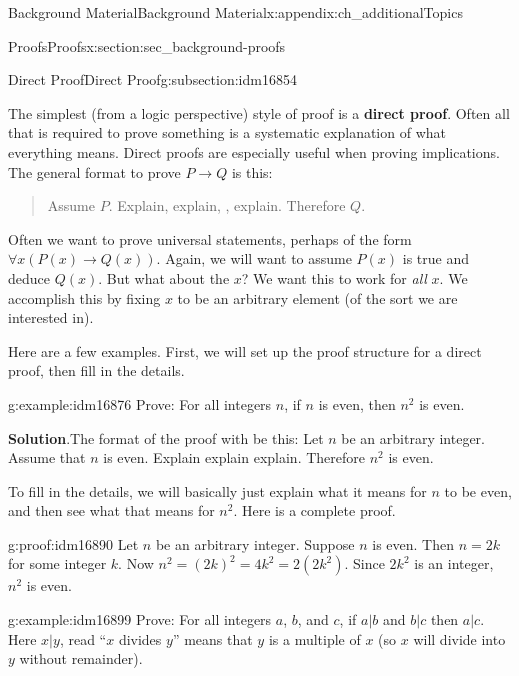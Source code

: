 \documentclass[oneside,10pt,]{book}
\newcommand{\terminology}[1]{\textbf{#1}}
\numberwithin{equation}{chapter}
\def\imp{\rightarrow}
\begin{document}
\begin{appendixptx}{Background Material}{}{Background Material}{}{}{x:appendix:ch_additionalTopics}
\begin{sectionptx}{Proofs}{}{Proofs}{}{}{x:section:sec_background-proofs}
\begin{introduction}{}
\end{introduction}%
%
%
\typeout{************************************************}
\typeout{************************************************}
%
\begin{subsectionptx}{Direct Proof}{}{Direct Proof}{}{}{g:subsection:idm16854}
%
\par
The simplest (from a logic perspective) style of proof is a \terminology{direct proof}. Often all that is required to prove something is a systematic explanation of what everything means. Direct proofs are especially useful when proving implications. The general format to prove \(P \imp Q\) is this:%
\begin{quote}%
Assume \(P\). Explain, explain, \textellipsis{}, explain. Therefore \(Q\).%
\end{quote}
Often we want to prove universal statements, perhaps of the form \(\forall x (P(x) \imp Q(x))\). Again, we will want to assume \(P(x)\) is true and deduce \(Q(x)\). But what about the \(x\)? We want this to work for \emph{all} \(x\). We accomplish this by fixing \(x\) to be an arbitrary element (of the sort we are interested in).%
\par
Here are a few examples. First, we will set up the proof structure for a direct proof, then fill in the details.%
\begin{example}{}{g:example:idm16876}%
Prove: For all integers \(n\), if \(n\) is even, then \(n^2\) is even.%
\par\smallskip%
\noindent\textbf{Solution}.\hypertarget{g:solution:idm16882}{}\quad{}The format of the proof with be this: Let \(n\) be an arbitrary integer. Assume that \(n\) is even. Explain explain explain. Therefore \(n^2\) is even.%
\par
To fill in the details, we will basically just explain what it means for \(n\) to be even, and then see what that means for \(n^2\). Here is a complete proof.%
\begin{proofptx}{}{g:proof:idm16890}
Let \(n\) be an arbitrary integer. Suppose \(n\) is even. Then \(n = 2k\) for some integer \(k\). Now \(n^2 = (2k)^2 = 4k^2 = 2(2k^2)\). Since \(2k^2\) is an integer, \(n^2\) is even.%
\end{proofptx}
\end{example}
\begin{example}{}{g:example:idm16899}%
Prove: For all integers \(a\), \(b\), and \(c\), if \(a|b\) and \(b|c\) then \(a|c\). Here \(x|y\), read ``\(x\) divides \(y\)'' means that \(y\) is a multiple of \(x\) (so \(x\) will divide into \(y\) without remainder).%

\end{example}
\end{subsectionptx}
\end{sectionptx}
\end{appendixptx}
\end{document}
